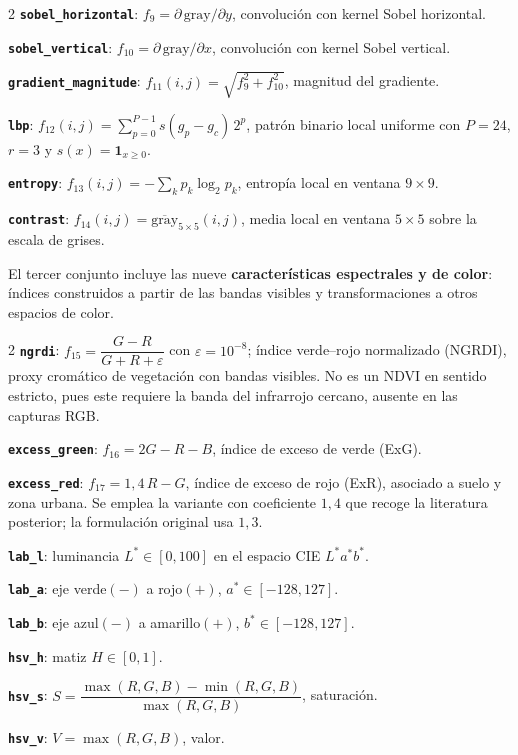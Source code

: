 \begin{multicols}{2}
\small\setlength{\parindent}{0pt}\setlength{\parskip}{4pt}
\textbf{\texttt{sobel\_horizontal}}: $f_9 = \partial\,\text{gray}/\partial y$, convolución con kernel Sobel horizontal.\par
\textbf{\texttt{sobel\_vertical}}: $f_{10} = \partial\,\text{gray}/\partial x$, convolución con kernel Sobel vertical.\par
\textbf{\texttt{gradient\_magnitude}}: $f_{11}(i,j) = \sqrt{f_9^2 + f_{10}^2}$, magnitud del gradiente.\par
\textbf{\texttt{lbp}}: $f_{12}(i,j)=\sum_{p=0}^{P-1}s(g_p - g_c)\,2^p$, patrón binario local uniforme con $P=24$, $r=3$ y $s(x)=\mathbf{1}_{x\ge0}$.\par
\textbf{\texttt{entropy}}: $f_{13}(i,j) = -\sum_k p_k\log_2 p_k$, entropía local en ventana $9\times9$.\par
\textbf{\texttt{contrast}}: $f_{14}(i,j) = \overline{\text{gray}}_{5\times5}(i,j)$, media local en ventana $5\times5$ sobre la escala de grises.\par
\end{multicols}

El tercer conjunto incluye las nueve \textbf{características espectrales y de color}: índices construidos a partir de las bandas visibles y transformaciones a otros espacios de color.

\begin{multicols}{2}
\small\setlength{\parindent}{0pt}\setlength{\parskip}{4pt}
\textbf{\texttt{ngrdi}}: $f_{15} = \dfrac{G - R}{G + R + \varepsilon}$ con $\varepsilon=10^{-8}$; índice verde--rojo normalizado (NGRDI), proxy cromático de vegetación con bandas visibles. No es un NDVI en sentido estricto, pues este requiere la banda del infrarrojo cercano, ausente en las capturas RGB.\par
\textbf{\texttt{excess\_green}}: $f_{16} = 2G - R - B$, índice de exceso de verde (ExG).\par
\textbf{\texttt{excess\_red}}: $f_{17} = 1{,}4\,R - G$, índice de exceso de rojo (ExR), asociado a suelo y zona urbana. Se emplea la variante con coeficiente $1{,}4$ que recoge la literatura posterior; la formulación original usa $1{,}3$.\par
\textbf{\texttt{lab\_l}}: luminancia $L^*\in[0,100]$ en el espacio CIE $L^*a^*b^*$.\par
\textbf{\texttt{lab\_a}}: eje verde$(-)$ a rojo$(+)$, $a^*\in[-128,127]$.\par
\textbf{\texttt{lab\_b}}: eje azul$(-)$ a amarillo$(+)$, $b^*\in[-128,127]$.\par
\textbf{\texttt{hsv\_h}}: matiz $H\in[0,1]$.\par
\textbf{\texttt{hsv\_s}}: $S = \dfrac{\max(R,G,B)-\min(R,G,B)}{\max(R,G,B)}$, saturación.\par
\textbf{\texttt{hsv\_v}}: $V = \max(R,G,B)$, valor.\par
\end{multicols}

